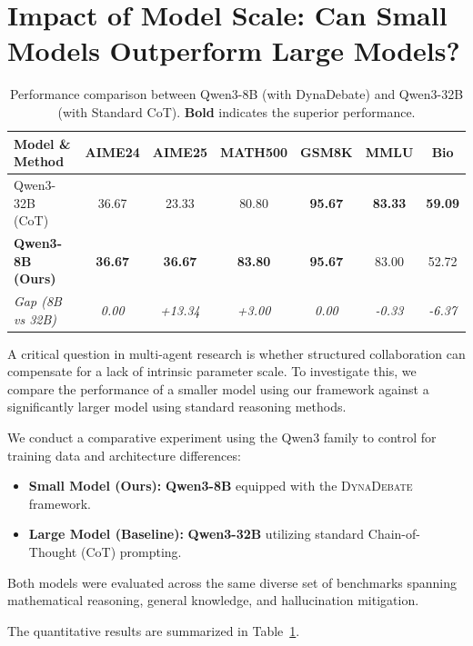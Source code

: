 \section{Impact of Model Scale: Can Small Models Outperform Large Models?}
\label{app:model_scale}

\begin{table}[h]
    \centering
    \small
    \begin{tabular}{lcccccc}
        \toprule
        \textbf{Model \& Method} & \textbf{AIME24} & \textbf{AIME25} & \textbf{MATH500} & \textbf{GSM8K} & \textbf{MMLU} & \textbf{Bio} \\
        \midrule
        Qwen3-32B (CoT) & 36.67 & 23.33 & 80.80 & \textbf{95.67} & \textbf{83.33} & \textbf{59.09} \\
        \textbf{Qwen3-8B (Ours)} & \textbf{36.67} & \textbf{36.67} & \textbf{83.80} & \textbf{95.67} & 83.00 & 52.72 \\
        \midrule
        \textit{Gap (8B vs 32B)} & \textit{0.00} & \textit{+13.34} & \textit{+3.00} & \textit{0.00} & \textit{-0.33} & \textit{-6.37} \\
        \bottomrule
    \end{tabular}
     \caption{Performance comparison between Qwen3-8B (with DynaDebate) and Qwen3-32B (with Standard CoT). \textbf{Bold} indicates the superior performance.}
    \label{tab:scale_comparison}
\end{table}

A critical question in multi-agent research is whether structured collaboration can compensate for a lack of intrinsic parameter scale. To investigate this, we compare the performance of a smaller model using our framework against a significantly larger model using standard reasoning methods.

We conduct a comparative experiment using the Qwen3 family to control for training data and architecture differences:
\begin{itemize}
    \item \textbf{Small Model (Ours):} \textbf{Qwen3-8B} equipped with the \textsc{DynaDebate} framework.
    \item \textbf{Large Model (Baseline):} \textbf{Qwen3-32B} utilizing standard Chain-of-Thought (CoT) prompting.
\end{itemize}
Both models were evaluated across the same diverse set of benchmarks spanning mathematical reasoning, general knowledge, and hallucination mitigation.

The quantitative results are summarized in Table~\ref{tab:scale_comparison}.


